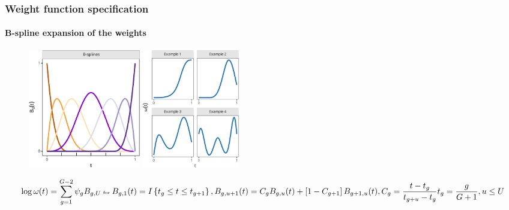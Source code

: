 \documentclass{snedecorbeamer}
\begin{document}
\begin{frame}
  \frametitle{Weight function specification}
  \framesubtitle{B-spline expansion of the weights}

  \begin{figure}
    \centering
    \includegraphics[height=14em]{inc/bew_bsplines_basis_fsc070.pdf}
    \includegraphics[height=14em]{inc/bew_bsplines_weights_fsc070.pdf}
  \end{figure}
  \begin{equation}
    \tiny
    \log\omega(t)
    \label{eq:bew-log}
    =
    \sum_{g = 1}^{G - 2} \psi_{g} B_{g, U}
    \text{ for }
    B_{g,1}(t) = I\left\{{t_{g} \le t \le t_{g+1}}\right\},
    B_{g,u + 1}(t) =
    C_g B_{g,u}(t)
    + \left[1 - C_{g+1}\right] B_{g + 1,u}(t),
    C_g = \frac{t - t_g}{t_{g + u} - t_g}
    t_g = \frac{g}{G+1},
    u \le U
  \end{equation}

\end{frame}
\end{document}
